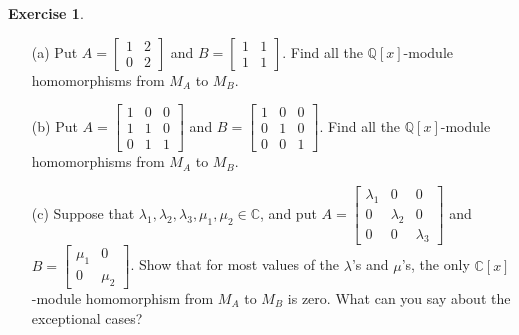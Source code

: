 \documentclass{amsart}
\newcommand{\bsm}       {\left[\begin{smallmatrix}}
\newcommand{\esm}       {\end{smallmatrix}\right]}
\newcommand{\C}         {{\mathbb{C}}}
\newcommand{\Q}         {{\mathbb{Q}}}
\newcommand{\lm}        {\lambda}
\newcommand{\ip}[1]     {\langle #1\rangle}
\renewcommand{\:}{\colon}
\theoremstyle{definition}
\newtheorem{exercise}{Exercise}[section]
\begin{document}
\begin{exercise}
 \begin{itemize}
  \item[(a)] Put $A=\bsm 1&2\\0&2\esm$ and $B=\bsm 1&1\\1&1\esm$.
   Find all the $\Q[x]$-module homomorphisms from $M_A$ to $M_B$.
  \item[(b)] Put $A=\bsm 1&0&0\\1&1&0\\0&1&1\esm$ and
   $B=\bsm 1&0&0\\0&1&0\\0&0&1\esm$.  Find all the $\Q[x]$-module
   homomorphisms from $M_A$ to $M_B$. 
  \item[(c)] Suppose that $\lm_1,\lm_2,\lm_3,\mu_1,\mu_2\in\C$, and
   put $A=\bsm\lm_1&0&0\\0&\lm_2&0\\0&0&\lm_3\esm$ and
   $B=\bsm\mu_1&0\\0&\mu_2\esm$.  Show that for most values of the
   $\lm$'s and $\mu$'s, the only $\C[x]$-module homomorphism from
   $M_A$ to $M_B$ is zero.  What can you say about the exceptional
   cases?
 \end{itemize} 
\end{exercise}
\end{document}
